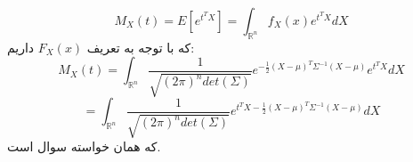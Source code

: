\parte{}
\[M_X(t) = E[e^{t^{T}X}] = \int_{\mathbb{R}^{n}}{f_{X}(x) e^{t^{T}X}} dX \]
که با توجه به تعریف $F_X(x)$ داریم:
\[M_X(t) =  \int_{\mathbb{R}^{n}}{\frac{1}{\sqrt{(2\pi)^n det(\Sigma)}} e^{-\frac{1}{2}(X-\mu)^{T}\Sigma^{-1}(X-\mu)} e^{t^{T}X}} dX\]
\[ = \int_{\mathbb{R}^{n}}{\frac{1}{\sqrt{(2\pi)^n det(\Sigma)}} e^{t^{T}X-\frac{1}{2}(X-\mu)^{T}\Sigma^{-1}(X-\mu)}} dX \]
که همان خواسته سوال است.
\parte{}
\parte{}